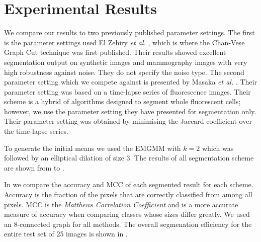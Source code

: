 \documentclass[10pt, journal, letterpaper, onecolumn, draftcls]{IEEEtran}
\begin{document}
\section{Experimental Results}
\label{sec:Expresults}
We compare our results to two previously published parameter settings.
The first is the parameter settings used El Zehiry \textit{et al.} \cite{ElZehiry2007}, which is where the Chan-Vese Graph Cut technique was first published.
Their results showed excellent segmentation output on synthetic images and mammography images with very high robustness against noise. They do not specify the noise type.
The second parameter setting which we compete against is presented by Masaka \textit{et al.} \cite{Maska2013}.
Their parameter setting was based on a time-lapse series of fluorescence images. Their scheme is a hybrid of algorithms designed to segment whole fluorescent cells; however, we use the parameter setting they have presented for segmentation only. Their parameter setting was obtained by minimising the Jaccard coefficient over the time-lapse series.

To generate the initial means we used the EMGMM with $k=2$ which was followed by an elliptical dilation of size $3$.
The results of all segmentation scheme are shown from  to .

In  we compare the accuracy and MCC of each segmented result for each scheme. Accuracy is the fraction of the pixels that are correctly classified from among all pixels. MCC is the \textit{Matthews Correlation Coefficient} and is a more accurate measure of accuracy when comparing classes whose sizes differ greatly. 
We used an 8-connected graph for all methods.
The overall segmenation efficiency for the entire test set of 25 images is shown in .
\end{document}
